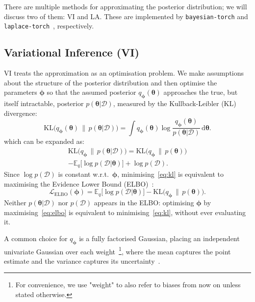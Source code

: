 \documentclass[conference]{IEEEtran}
\newcommand{\btheta}{\bm{\theta}}
\newcommand{\cD}{\mathcal{D}}
\newcommand{\KL}{\mathrm{KL}}
\newcommand{\ELBO}{\mathcal{L}_{\text{ELBO}}}
\begin{document}
There are multiple methods for approximating the posterior distribution; we will discuss two
of them: VI and LA. These are implemented by \texttt{bayesian-torch} and
\texttt{laplace-torch}~\citep{daxberger2021laplace}, respectively.

\subsection{Variational Inference (VI)~\citep{murphy2023pml,goan2020bayesian}}
\label{sec:theory:vi}
VI treats the approximation as an optimisation problem. We make assumptions about the
structure of the posterior distribution and then optimise the parameters $\bm\phi$ so that
the assumed posterior $q_{\bm\phi}(\btheta)$ approaches the true, but itself intractable,
posterior $p(\btheta|\cD)$, measured by the Kullback-Leibler (KL) divergence:
\begin{equation}
    \KL\bigl(q_{\bm\phi}(\btheta)\,\|\,p(\btheta|\cD)\bigr)
    = \int q_{\bm\phi}(\btheta)\log\frac{q_{\bm\phi}(\btheta)}{p(\btheta|\cD)}\,\mathrm{d}\btheta.
    \label{eq:kl}
\end{equation} which can be expanded as:
\begin{multline}
    \KL\bigl(q_{\bm\phi}\,\|\,p(\btheta|\cD)\bigr)
    = \KL\bigl(q_{\bm\phi}\,\|\,p(\btheta)\bigr) \\
    - \mathbb{E}_{q}\!\bigl[\log p(\cD|\btheta)\bigr]
    + \log p(\cD).
    \label{eq:kl_expanded}
\end{multline}
Since $\log p(\cD)$ is constant w.r.t.\ $\bm\phi$, minimising~\eqref{eq:kl} is equivalent to
maximising the Evidence Lower Bound
(ELBO)~\citep{blundell2015weight,goan2020bayesian,murphy2023pml}:
\begin{equation}
    \ELBO(\bm\phi)
    = \mathbb{E}_{q}\!\bigl[\log p(\cD|\btheta)\bigr]
    - \KL\bigl(q_{\bm\phi}\,\|\,p(\btheta)\bigr).
    \label{eq:elbo}
\end{equation}
Neither $p(\btheta|\cD)$ nor $p(\cD)$ appears in the ELBO: optimising $\bm\phi$ by
maximising~\eqref{eq:elbo} is equivalent to minimising~\eqref{eq:kl}, without ever
evaluating it.

A common choice for $q_{\bm\phi}$ is a fully factorised Gaussian, placing an independent
univariate Gaussian over each weight~\footnote{For convenience, we use "weight" to also
refer to biases from now on unless stated otherwise.}, where the mean captures the point
estimate and the variance captures its uncertainty~\citep{murphy2023pml}.
\end{document}
